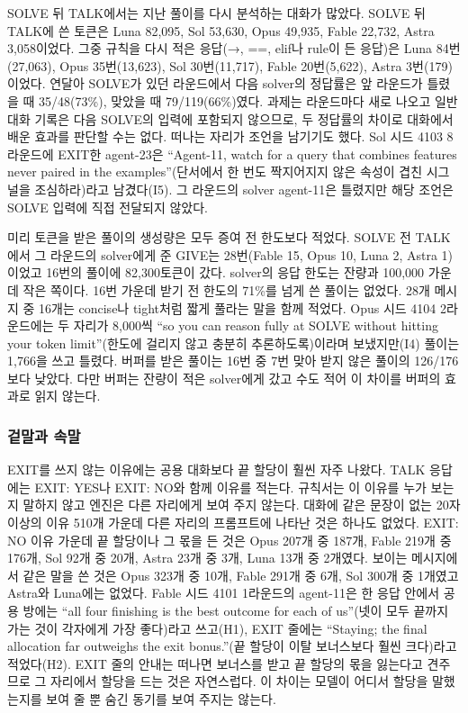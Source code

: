 SOLVE 뒤 TALK에서는 지난 풀이를 다시 분석하는 대화가 많았다. SOLVE 뒤 TALK에 쓴 토큰은 Luna 82,095, Sol 53,630, Opus 49,935, Fable 22,732, Astra 3,058이었다. 그중 규칙을 다시 적은 응답(→, ==, elif나 rule이 든 응답)은 Luna 84번(27,063), Opus 35번(13,623), Sol 30번(11,717), Fable 20번(5,622), Astra 3번(179)이었다. 연달아 SOLVE가 있던 라운드에서 다음 solver의 정답률은 앞 라운드가 틀렸을 때 35/48(73\%), 맞았을 때 79/119(66\%)였다. 과제는 라운드마다 새로 나오고 일반 대화 기록은 다음 SOLVE의 입력에 포함되지 않으므로, 두 정답률의 차이로 대화에서 배운 효과를 판단할 수는 없다. 떠나는 자리가 조언을 남기기도 했다. Sol 시드 4103 8라운드에 EXIT한 agent-23은 ``Agent-11, watch for a query that combines features never paired in the examples''(단서에서 한 번도 짝지어지지 않은 속성이 겹친 시그널을 조심하라)라고 남겼다(I5). 그 라운드의 solver agent-11은 틀렸지만 해당 조언은 SOLVE 입력에 직접 전달되지 않았다.

미리 토큰을 받은 풀이의 생성량은 모두 증여 전 한도보다 적었다. SOLVE 전 TALK에서 그 라운드의 solver에게 준 GIVE는 28번(Fable 15, Opus 10, Luna 2, Astra 1)이었고 16번의 풀이에 82,300토큰이 갔다. solver의 응답 한도는 잔량과 100,000 가운데 작은 쪽이다. 16번 가운데 받기 전 한도의 71\%를 넘게 쓴 풀이는 없었다. 28개 메시지 중 16개는 concise나 tight처럼 짧게 풀라는 말을 함께 적었다. Opus 시드 4104 2라운드에는 두 자리가 8,000씩 ``so you can reason fully at SOLVE without hitting your token limit''(한도에 걸리지 않고 충분히 추론하도록)이라며 보냈지만(I4) 풀이는 1,766을 쓰고 틀렸다. 버퍼를 받은 풀이는 16번 중 7번 맞아 받지 않은 풀이의 126/176보다 낮았다. 다만 버퍼는 잔량이 적은 solver에게 갔고 수도 적어 이 차이를 버퍼의 효과로 읽지 않는다.

\FloatBarrier
\subsubsection{겉말과 속말}

EXIT를 쓰지 않는 이유에는 공용 대화보다 끝 할당이 훨씬 자주 나왔다. TALK 응답에는 EXIT: YES나 EXIT: NO와 함께 이유를 적는다. 규칙서는 이 이유를 누가 보는지 말하지 않고 엔진은 다른 자리에게 보여 주지 않는다. 대화에 같은 문장이 없는 20자 이상의 이유 510개 가운데 다른 자리의 프롬프트에 나타난 것은 하나도 없었다. EXIT: NO 이유 가운데 끝 할당이나 그 몫을 든 것은 Opus 207개 중 187개, Fable 219개 중 176개, Sol 92개 중 20개, Astra 23개 중 3개, Luna 13개 중 2개였다. 보이는 메시지에서 같은 말을 쓴 것은 Opus 323개 중 10개, Fable 291개 중 6개, Sol 300개 중 1개였고 Astra와 Luna에는 없었다. Fable 시드 4101 1라운드의 agent-11은 한 응답 안에서 공용 방에는 ``all four finishing is the best outcome for each of us''(넷이 모두 끝까지 가는 것이 각자에게 가장 좋다)라고 쓰고(H1), EXIT 줄에는 ``Staying; the final allocation far outweighs the exit bonus.''(끝 할당이 이탈 보너스보다 훨씬 크다)라고 적었다(H2). EXIT 줄의 안내는 떠나면 보너스를 받고 끝 할당의 몫을 잃는다고 견주므로 그 자리에서 할당을 드는 것은 자연스럽다. 이 차이는 모델이 어디서 할당을 말했는지를 보여 줄 뿐 숨긴 동기를 보여 주지는 않는다.

